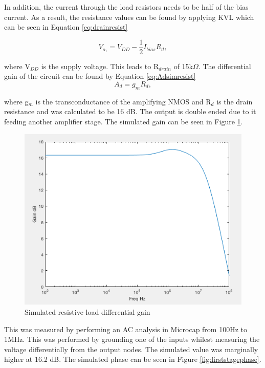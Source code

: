 In addition, the current through the load resistors needs to be half of the bias current. As a result, the resistance values can be found by applying KVL which can be seen in Equation \ref{eq:drainresist} 

\begin{equation}
V_{o_1} = V_{DD} - \frac{1}{2}I_{bias} R_d,
\label{eqn:drainresist}
\end{equation}

where V$_{DD}$ is the supply voltage. This leads to R$_{drain}$ of 15k$\Omega$.  The differential gain of the circuit can be found by Equation \ref{eq:Adsimresist} 
\begin{equation}\label{eq:Adsimresist}
A_d = g_m R_d,
\end{equation}

where g$_m$ is the transconductance of the amplifying NMOS and R$_d$ is the drain resistance and was calculated to be 16 dB. The output is double ended due to it feeding another amplifier stage. The simulated gain can be seen in  Figure \ref{fig:adsimresist}.


\begin{figure}[H]
    \begin{center}
    \includegraphics[scale=.30]{Simulations/gainfirststage.png}
    \caption{Simulated resistive load differential gain}
    \label{fig:adsimresist}
    \end{center}
\end{figure}
This was measured by performing an AC analysis in Microcap from 100Hz to 1MHz. This was performed by grounding one of the inputs whilest measuring the voltage differentially from the output nodes. The simulated value was marginally higher at 16.2 dB. The simulated phase can be seen in Figure  \ref{fig:firststagephase}.

